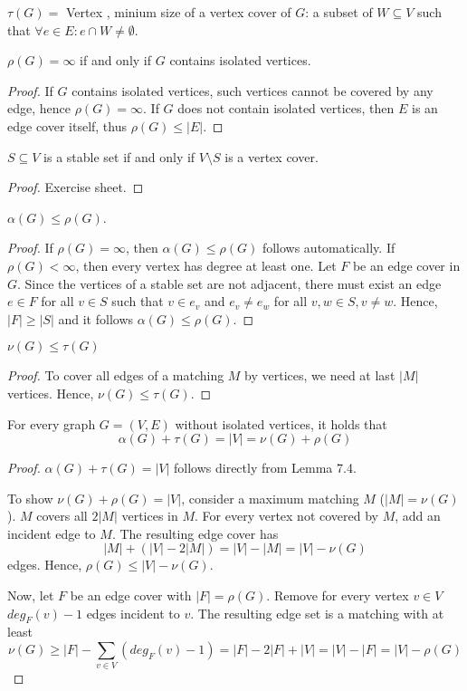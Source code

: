 $\tau(G) = $ Vertex , minium size of a
vertex cover of $G$: a subset of $W \subseteq V$ such that $\forall e \in E:
e \cap W \neq \emptyset$.

\begin{lem}
$\rho(G) = \infty$ if and only if $G$ contains isolated vertices.
\end{lem}
\begin{proof}
If $G$ contains isolated vertices, such vertices cannot be covered by any
edge, hence $\rho(G) = \infty$. If $G$ does not contain isolated vertices,
then $E$ is an edge cover itself, thus $\rho(G) \leq |E|$.
\end{proof}

\begin{lem} %
$S \subseteq V$ is a stable set if and only if $V \setminus S$ is a vertex
cover.
\end{lem}
\begin{proof}
Exercise sheet.
\end{proof}

\begin{lem} %
$\alpha(G) \leq \rho(G)$.
\end{lem}
\begin{proof}
If $\rho(G) = \infty$, then $\alpha(G) \leq \rho(G)$ follows automatically.
If $\rho(G) < \infty$, then every vertex has degree at least one. Let $F$ be
an edge cover in $G$. Since the vertices of a stable set are not adjacent,
there must exist an edge $e \in F$ for all $v \in S$ such that $v \in e_v$
and $e_v \neq e_w$ for all $v, w \in S, v \neq w$. Hence, $|F| \geq |S|$ and
it follows $\alpha(G) \leq \rho(G)$.
\end{proof}

\begin{lem} %
$\nu(G) \leq \tau(G)$
\end{lem}
\begin{proof}
To cover all edges of a matching $M$ by vertices, we need at last $|M|$
vertices. Hence, $\nu(G) \leq \tau(G)$.
\end{proof}
\begin{thm}

For every graph $G = (V, E)$ without isolated vertices, it holds that
\[
\alpha(G) + \tau(G) = |V| = \nu(G) + \rho(G)
\]
\end{thm}
\begin{proof}
$\alpha(G) + \tau(G) = |V|$ follows directly from Lemma 7.4.

To show $\nu(G) + \rho(G) = |V|$, consider a maximum matching $M$ ($|M| =
\nu(G)$). $M$ covers all $2 |M|$ vertices in $M$. For every vertex not
covered by $M$, add an incident edge to $M$. The resulting edge cover has
\[
|M| + (|V| - 2 |M|) = |V| - |M| = |V| - \nu(G)
\] edges. Hence, $\rho(G) \leq
|V| - \nu(G)$.

Now, let $F$ be an edge cover with $|F| = \rho(G)$. Remove for every vertex
$v \in V$ $deg_F(v) - 1$ edges incident to $v$. The resulting edge set is a
matching with at least
\[
\nu(G) \geq |F| - \sum\limits_{v \in V} (deg_F(v) - 1) = |F| - 2 |F| + |V| = |V| - |F|
= |V| - \rho(G)
\]
\end{proof}

